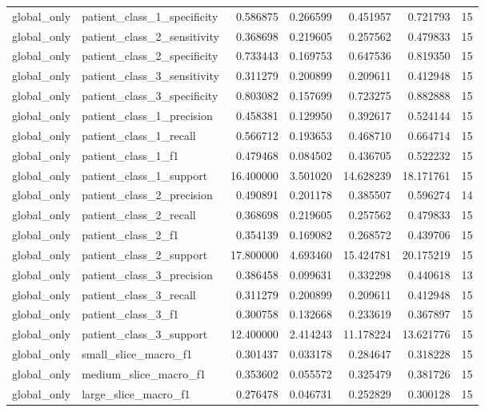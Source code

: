 \begin{tabular}{llrrrrr}
global_only & patient_class_1_specificity & 0.586875 & 0.266599 & 0.451957 & 0.721793 & 15 \\
global_only & patient_class_2_sensitivity & 0.368698 & 0.219605 & 0.257562 & 0.479833 & 15 \\
global_only & patient_class_2_specificity & 0.733443 & 0.169753 & 0.647536 & 0.819350 & 15 \\
global_only & patient_class_3_sensitivity & 0.311279 & 0.200899 & 0.209611 & 0.412948 & 15 \\
global_only & patient_class_3_specificity & 0.803082 & 0.157699 & 0.723275 & 0.882888 & 15 \\
global_only & patient_class_1_precision & 0.458381 & 0.129950 & 0.392617 & 0.524144 & 15 \\
global_only & patient_class_1_recall & 0.566712 & 0.193653 & 0.468710 & 0.664714 & 15 \\
global_only & patient_class_1_f1 & 0.479468 & 0.084502 & 0.436705 & 0.522232 & 15 \\
global_only & patient_class_1_support & 16.400000 & 3.501020 & 14.628239 & 18.171761 & 15 \\
global_only & patient_class_2_precision & 0.490891 & 0.201178 & 0.385507 & 0.596274 & 14 \\
global_only & patient_class_2_recall & 0.368698 & 0.219605 & 0.257562 & 0.479833 & 15 \\
global_only & patient_class_2_f1 & 0.354139 & 0.169082 & 0.268572 & 0.439706 & 15 \\
global_only & patient_class_2_support & 17.800000 & 4.693460 & 15.424781 & 20.175219 & 15 \\
global_only & patient_class_3_precision & 0.386458 & 0.099631 & 0.332298 & 0.440618 & 13 \\
global_only & patient_class_3_recall & 0.311279 & 0.200899 & 0.209611 & 0.412948 & 15 \\
global_only & patient_class_3_f1 & 0.300758 & 0.132668 & 0.233619 & 0.367897 & 15 \\
global_only & patient_class_3_support & 12.400000 & 2.414243 & 11.178224 & 13.621776 & 15 \\
global_only & small_slice_macro_f1 & 0.301437 & 0.033178 & 0.284647 & 0.318228 & 15 \\
global_only & medium_slice_macro_f1 & 0.353602 & 0.055572 & 0.325479 & 0.381726 & 15 \\
global_only & large_slice_macro_f1 & 0.276478 & 0.046731 & 0.252829 & 0.300128 & 15 \\

\end{tabular}
